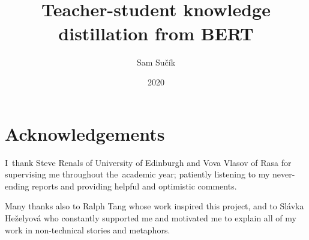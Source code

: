 \documentclass[bsc,frontabs,singlespacing,parskip,deptreport]{infthesis}
\begin{document}

\VerbatimFootnotes

\title{
  \vspace{-5.0cm}  \vspace{1cm} \\ 
  Teacher-student knowledge distillation from BERT
}

\author{Sam Su\v{c}\'ik}

\project{
  \vspace{3cm}{\bf MInf Project (Part 2) Report}
}

\date{2020}


\maketitle

\section*{Acknowledgements}{
  I~thank Steve Renals of University of Edinburgh and Vova Vlasov of Rasa for supervising me throughout the~academic year; patiently listening to my never-ending reports and providing helpful and optimistic comments.

  Many thanks also to Ralph Tang whose work inspired this project, and to Sl\'avka He\v{z}elyov\'a who constantly supported me and motivated me to explain all of my work in non-technical stories and metaphors.
}

{
  \hypersetup{linkcolor=black}
  \tableofcontents
}
\end{document}
